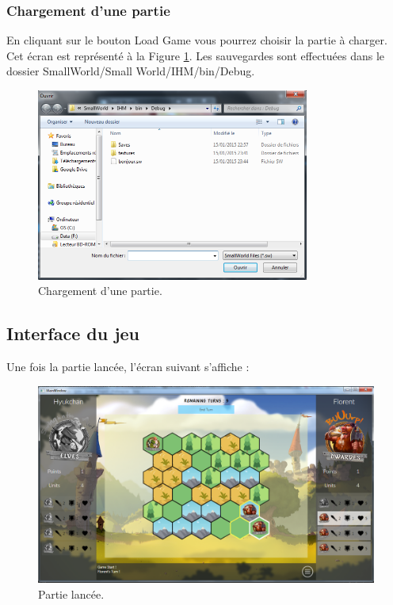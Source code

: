 \documentclass[a4paper]{article}
\begin{document}
		\newpage\subsubsection{Chargement d'une partie}
		En cliquant sur le bouton \og Load Game\fg{} vous pourrez choisir la partie à charger. Cet écran est représenté à la Figure \ref{fig:loading}. Les sauvegardes sont effectuées dans le dossier SmallWorld/Small World/IHM/bin/Debug.
		\begin{figure}[h!]
			\centering
			\includegraphics[width=0.8\textwidth]{../../IHM/loading.png}
			\caption{Chargement d'une partie.}
			\label{fig:loading}
		\end{figure}


	\subsection{Interface du jeu}
	Une fois la partie lancée, l'écran suivant s'affiche :
		\begin{figure}[h!]
			\centering
			\includegraphics[width=\textwidth]{../../IHM/partie_lancee.png}
			\caption{Partie lancée.}
			\label{fig:debut_partie}
		\end{figure}
\end{document}

